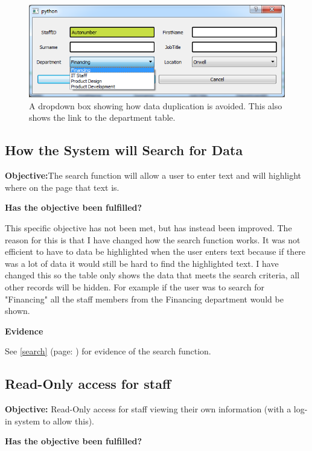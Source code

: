 \begin{figure}[H]
    \includegraphics[width=\textwidth]{./Evaluation/Images/dropdown.png}
    \caption{A dropdown box showing how data duplication is avoided. This also shows the link to the department table.} 
\end{figure}



\subsection{How the System will Search for Data}

\textbf{Objective:}The search function will allow a user to enter text and will highlight where on the page that text is.

\textbf{Has the objective been fulfilled?}

This specific objective has not been met, but has instead been improved. The reason for this is that I have changed how the search function works. It was not efficient to have to data be highlighted when the user enters text because if there was a lot of data it would still be hard to find the highlighted text. I have changed this so the table only shows the data that meets the search criteria, all other records will be hidden. For example if the user was to search for "Financing" all the staff members from the Financing department would be shown.

\textbf{Evidence}

See \ref{search} (page: \pageref{search}) for evidence of the search function.


\subsection{Read-Only access for staff}

\textbf{Objective:} Read-Only access for staff viewing their own information (with a log-in system to allow this).

\textbf{Has the objective been fulfilled?}

